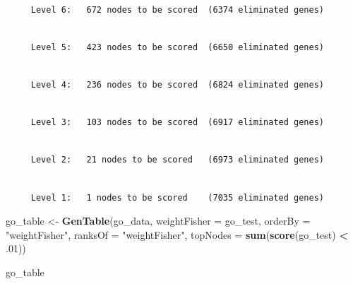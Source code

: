 \documentclass[]{article}
\newenvironment{Shaded}{\begin{snugshade}}{\end{snugshade}}
\newcommand{\KeywordTok}[1]{\textcolor[rgb]{0.13,0.29,0.53}{\textbf{#1}}}
\newcommand{\DataTypeTok}[1]{\textcolor[rgb]{0.13,0.29,0.53}{#1}}
\newcommand{\DecValTok}[1]{\textcolor[rgb]{0.00,0.00,0.81}{#1}}
\newcommand{\StringTok}[1]{\textcolor[rgb]{0.31,0.60,0.02}{#1}}
\newcommand{\OperatorTok}[1]{\textcolor[rgb]{0.81,0.36,0.00}{\textbf{#1}}}
\newcommand{\NormalTok}[1]{#1}
\begin{document}
\begin{verbatim}

     Level 6:   672 nodes to be scored  (6374 eliminated genes)
\end{verbatim}

\begin{verbatim}

     Level 5:   423 nodes to be scored  (6650 eliminated genes)
\end{verbatim}

\begin{verbatim}

     Level 4:   236 nodes to be scored  (6824 eliminated genes)
\end{verbatim}

\begin{verbatim}

     Level 3:   103 nodes to be scored  (6917 eliminated genes)
\end{verbatim}

\begin{verbatim}

     Level 2:   21 nodes to be scored   (6973 eliminated genes)
\end{verbatim}

\begin{verbatim}

     Level 1:   1 nodes to be scored    (7035 eliminated genes)
\end{verbatim}

\begin{Shaded}
\begin{Highlighting}[]
\NormalTok{go_table <-}\StringTok{ }\KeywordTok{GenTable}\NormalTok{(go_data, }\DataTypeTok{weightFisher =}\NormalTok{ go_test,}
                         \DataTypeTok{orderBy =} \StringTok{"weightFisher"}\NormalTok{, }\DataTypeTok{ranksOf =} \StringTok{"weightFisher"}\NormalTok{,}
                         \DataTypeTok{topNodes =} \KeywordTok{sum}\NormalTok{(}\KeywordTok{score}\NormalTok{(go_test) }\OperatorTok{<}\StringTok{ }\NormalTok{.}\DecValTok{01}\NormalTok{))}

\NormalTok{go_table}
\end{Highlighting}
\end{Shaded}
\end{document}
